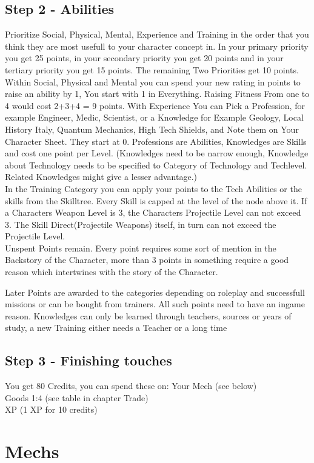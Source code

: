 \documentclass{book}
\begin{document}
    \subsection{Step 2 - Abilities}\label{subsec:step2-Abilities}
    Prioritize Social, Physical, Mental, Experience and Training in the order that you think they are most
    usefull to your character concept in. \newline
    In your primary priority you get 25 points, in your secondary priority you get 20 points and in your tertiary
    priority you get 15 points.
    The remaining Two Priorities get 10 points.\newline
    Within Social, Physical and Mental you can spend your new rating in points to raise an ability by 1, You start with 1
    in Everything.
    Raising Fitness From one to 4 would cost 2+3+4 = 9 points.\newline
    With Experience You can Pick a Profession, for example Engineer, Medic, Scientist, or a Knowledge for Example
    Geology, Local History Italy, Quantum Mechanics, High Tech Shields, and Note them on Your Character Sheet.
    They start at
    0.
    Professions are Abilities, Knowledges are Skills and cost one point per Level. (Knowledges need to be narrow enough,
    Knowledge about Technology needs to be specified to Category of Technology and Techlevel.
    Related Knowledges might give
    a lesser advantage.)\\

    In the Training Category you can apply your points to the Tech Abilities or the skills from the Skilltree.
    Every Skill is capped at the level of the node above it.
    If a Characters Weapon Level is 3, the Characters Projectile
    Level can not exceed 3.
    The Skill Direct(Projectile Weapons) itself, in turn can not exceed the Projectile Level.\\


    Unspent Points remain.
    Every point requires some sort of mention in the Backstory of the Character, more than 3 points
    in something require a good reason which intertwines with the story of the Character.

    Later Points are awarded to the categories depending on roleplay and successfull missions or can be bought from
    trainers.
    All such points need to have an ingame reason.
    Knowledges can only be learned through teachers, sources or
    years of study, a new Training either needs a Teacher or a long time\\


    \subsection{Step 3 - Finishing touches}\label{subsec:step3-FinishingTouches}
    You get 80 Credits, you can spend these on:
    Your Mech (see below)\\
    Goods 1:4 (see table in chapter Trade)\\
    XP (1 XP for 10 credits)\\

    \section{Mechs}\label{sec:mechs}
    
\end{document}
